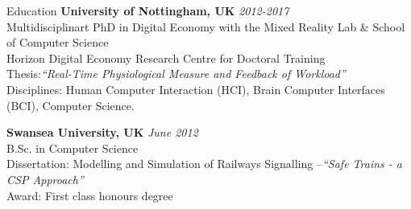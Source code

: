 \documentclass{resume} %
\begin{document}

\begin{rSection}{Education}
{\bf University of Nottingham, UK} \hfill {\em 2012-2017} \\
Multidisciplinart PhD in Digital Economy with the Mixed Reality Lab \& School of Computer Science \\
Horizon Digital Economy Research Centre for Doctoral Training \\
Thesis:\emph{``Real-Time Physiological Measure and Feedback of Workload''}\\
Disciplines: Human Computer Interaction (HCI), Brain Computer Interfaces (BCI), Computer Science.
\vspace{-1 mm}

{\bf Swansea University, UK} \hfill {\em June 2012} \\
B.Sc. in Computer Science \\
Dissertation: Modelling and Simulation of Railways Signalling –\emph{``Safe Trains - a CSP Approach''}\smallskip \\
Award: First class honours degree

\end{rSection}
\end{document}
